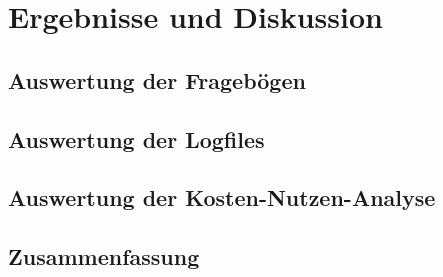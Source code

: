 \section{Ergebnisse und Diskussion}


\subsection{Auswertung der Fragebögen}
\label{sec:auswertungDerFrageboegen}

\subsection{Auswertung der Logfiles}


\subsection{Auswertung der Kosten-Nutzen-Analyse}


\subsection{Zusammenfassung}
